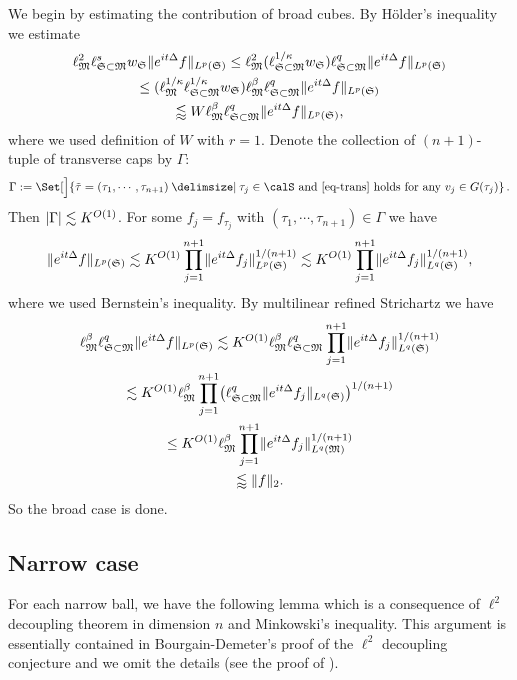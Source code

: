 \documentclass[biblatex]{pzorin-note}
\newcommand{\eit}{e^{i t \Delta}}
\newcommand{\bM}{\mathfrak{M}} %
\newcommand{\bS}{\mathfrak{S}} %
\begin{document}
We begin by estimating the contribution of broad cubes.
By H\"older's inequality we estimate
\begin{multline*}
\ell^{2}_{\bM} \ell^{s}_{\bS \subset \bM} w_{\bS} \norm{ \eit f }_{L^{p}(\bS)}
\leq
\ell^{2}_{\bM} (\ell^{1/\kappa}_{\bS \subset \bM} w_{\bS}) \ell^{q}_{\bS \subset \bM} \norm{\eit f}_{L^p(\bS)}\\
\leq
(\ell^{1/\kappa}_{\bM} \ell^{1/\kappa}_{\bS \subset \bM} w_{\bS})
\ell^{\beta}_{\bM} \ell^{q}_{\bS \subset \bM} \norm{\eit f}_{L^p(\bS)}\\
\lessapprox
W
\ell^{\beta}_{\bM} \ell^{q}_{\bS \subset \bM} \norm{\eit f}_{L^p(\bS)},
\end{multline*}
where we used definition of $W$ with $r=1$.
Denote the collection of $(n+1)$-tuple of transverse caps by $\Gamma$:
\[
\Gamma:=\Set[\Big]{ \tilde\tau=(\tau_1,\cdots,\tau_{n+1}) \given \tau_j\in \calS\text{ and } \eqref{eq-trans} \text{ holds for any } v_j\in G(\tau_j) }\,.
\]
Then $\lvert\Gamma\rvert \lesssim K^{O(1)}$.
For some $f_{j} = f_{\tau_{j}}$ with $(\tau_1,\cdots,\tau_{n+1})\in \Gamma$ we have
\[
\norm{ \eit f }_{L^{p}(\bS)}
\lesssim
K^{O(1)} \prod_{j=1}^{n+1} \norm{ \eit f_{j} }_{L^{p}(\bS)}^{1/(n+1)}
\lesssim
K^{O(1)} \prod_{j=1}^{n+1} \norm{ \eit f_{j} }_{L^{q}(\bS)}^{1/(n+1)},
\]
where we used Bernstein's inequality.
By multilinear refined Strichartz we have
\begin{multline*}
\ell^{\beta}_{\bM} \ell^{q}_{\bS \subset \bM} \norm{ \eit f }_{L^{p}(\bS)}
\lesssim
K^{O(1)}
\ell^{\beta}_{\bM} \ell^{q}_{\bS \subset \bM} \prod_{j=1}^{n+1} \norm{ \eit f_{j} }_{L^{q}(\bS)}^{1/(n+1)}\\
\lesssim
K^{O(1)}
\ell^{\beta}_{\bM} \prod_{j=1}^{n+1} \bigl( \ell^{q}_{\bS \subset \bM} \norm{ \eit f_{j} }_{L^{q}(\bS)} \bigr)^{1/(n+1)}\\
\leq
K^{O(1)}
\ell^{\beta}_{\bM} \prod_{j=1}^{n+1} \norm{ \eit f_{j} }_{L^{q}(\bM)}^{1/(n+1)}\\
\lessapprox
\norm{f}_{2}.
\end{multline*}
So the broad case is done.

\subsection{Narrow case} \label{sec-nr}

For each narrow ball, we have the following lemma which is a consequence of $\ell^2$ decoupling theorem in dimension $n$ and Minkowski's inequality.
This argument is essentially contained in Bourgain-Demeter's proof of the $\ell^2$ decoupling conjecture and we omit the details (see the proof of \cite[Proposition 5.5]{MR3374964}).
\end{document}
